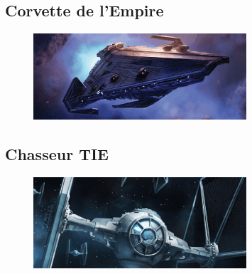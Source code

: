 \subsection{Corvette de l’Empire} \label{sec:empire-corvette}
\begin{figure}[h!]
    \centering
    \includegraphics[width=\linewidth]{_img/bestiary/raider-corvette.png}
\end{figure}

\newpage
\subsection{Chasseur TIE} \label{sec:tie-fighter}
\begin{figure}[h!]
    \centering
    \includegraphics[width=\linewidth]{_img/bestiary/tie-fighter.png}
\end{figure}